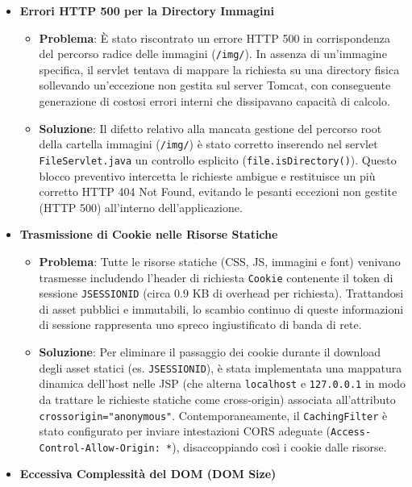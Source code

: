 \begin{itemize}
\begin{itemize}
    \end{itemize}
    \item \textbf{Errori HTTP 500 per la Directory Immagini}
    \begin{itemize}
        \item \textbf{Problema}: È stato riscontrato un errore HTTP 500 in corrispondenza del percorso radice delle immagini (\texttt{/img/}). In assenza di un'immagine specifica, il servlet tentava di mappare la richiesta su una directory fisica sollevando un'eccezione non gestita sul server Tomcat, con conseguente generazione di costosi errori interni che dissipavano capacità di calcolo.
        \item \textbf{Soluzione}: Il difetto relativo alla mancata gestione del percorso root della cartella immagini (\texttt{/img/}) è stato corretto inserendo nel servlet \texttt{FileServlet.java} un controllo esplicito (\texttt{file.isDirectory()}). Questo blocco preventivo intercetta le richieste ambigue e restituisce un più corretto HTTP 404 Not Found, evitando le pesanti eccezioni non gestite (HTTP 500) all'interno dell'applicazione.
    \end{itemize}
    \item \textbf{Trasmissione di Cookie nelle Risorse Statiche}
    \begin{itemize}
        \item \textbf{Problema}: Tutte le risorse statiche (CSS, JS, immagini e font) venivano trasmesse includendo l'header di richiesta \texttt{Cookie} contenente il token di sessione \texttt{JSESSIONID} (circa 0.9 KB di overhead per richiesta). Trattandosi di asset pubblici e immutabili, lo scambio continuo di queste informazioni di sessione rappresenta uno spreco ingiustificato di banda di rete.
        \item \textbf{Soluzione}: Per eliminare il passaggio dei cookie durante il download degli asset statici (es. \texttt{JSESSIONID}), è stata implementata una mappatura dinamica dell'host nelle JSP (che alterna \texttt{localhost} e \texttt{127.0.0.1} in modo da trattare le richieste statiche come cross-origin) associata all'attributo \texttt{crossorigin="anonymous"}. Contemporaneamente, il \texttt{CachingFilter} è stato configurato per inviare intestazioni CORS adeguate (\texttt{Access-Control-Allow-Origin: *}), disaccoppiando così i cookie dalle risorse.
    \end{itemize}
    \item \textbf{Eccessiva Complessità del DOM (DOM Size)}
    \begin{itemize}

\end{itemize}
\end{itemize}
